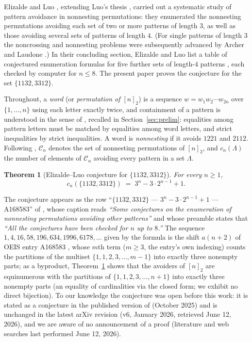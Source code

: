 \documentclass[11pt]{article}
\newtheorem{theorem}{Theorem}[section]
\theoremstyle{definition}
\theoremstyle{remark}
\newcommand{\nn}{[n]_2}
\begin{document}
Elizalde and Luo \cite{ElizaldeLuo}, extending Luo's thesis \cite{Luo2024},
carried out a systematic study of pattern avoidance in nonnesting
permutations: they enumerated the nonnesting permutations avoiding each set
of two or more patterns of length $3$, as well as those avoiding several sets
of patterns of length $4$. (For single patterns of length $3$ the noncrossing
and nonnesting problems were subsequently advanced by Archer and Laudone
\cite{ArcherLaudone}.) In their concluding section, Elizalde and Luo list a
table of conjectured enumeration formulas for five further sets of length-$4$
patterns \cite[Table~4]{ElizaldeLuo}, each checked by computer for
$n\le 8$. The present paper proves the conjecture for the set
$\{1132,3312\}$.

Throughout, a \emph{word} (or \emph{permutation of $\nn$}) is a sequence
$w=w_1w_2\cdots w_{2n}$ over $\{1,\dots,n\}$ using each letter exactly twice,
and containment of a pattern is understood in the sense of
\cite{ElizaldeLuo}, recalled in Section~\ref{sec:prelim}: equalities
among pattern letters must be matched by equalities among word letters, and
strict inequalities by strict inequalities. A word is \emph{nonnesting} if it
avoids $1221$ and $2112$. Following \cite{ElizaldeLuo}, $\mathcal C_n$
denotes the set of nonnesting permutations of $\nn$, and $c_n(\Lambda)$ the
number of elements of $\mathcal C_n$ avoiding every pattern in a set
$\Lambda$.

\begin{theorem}[Elizalde--Luo conjecture for $\{1132,3312\}$]\label{thm:main-intro}
For every $n\ge 1$,
\[
  c_n(\{1132,3312\}) \;=\; 3^n-3\cdot 2^{n-1}+1 .
\]
\end{theorem}

The conjecture appears as the row
``$\{1132,3312\}$ \;---\; $3^n-3\cdot2^{n-1}+1$ \;---\; A168583''
of \cite[Table~4]{ElizaldeLuo}, whose caption reads \emph{``Some conjectures
on the enumeration of nonnesting permutations avoiding other patterns''} and
whose preamble states that \emph{``All the conjectures have been checked for
$n$ up to $8$.''} The sequence
$1,4,16,58,196,634,1996,6178,\dots$ given by the formula is the shift
$a(n{+}2)$ of OEIS entry A168583 \cite{OEIS}, whose $m$th term ($m\ge3$, the
entry's own indexing) counts the partitions of the multiset
$\{1,1,2,3,\dots,m-1\}$ into exactly three nonempty parts; as a byproduct,
Theorem~\ref{thm:main-intro} shows that the avoiders of $\nn$ are
equinumerous with the partitions of $\{1,1,2,3,\dots,n+1\}$ into exactly
three nonempty parts (an equality of cardinalities via the closed form; we
exhibit no direct bijection). To our
knowledge the conjecture was open before this work: it is stated as a
conjecture in the published version of \cite{ElizaldeLuo} (October 2025)
and is unchanged in the latest arXiv revision (v6, January 2026, retrieved
June 12, 2026), and we are aware of no announcement of a proof (literature
and web searches last performed June 12, 2026).
\end{document}
